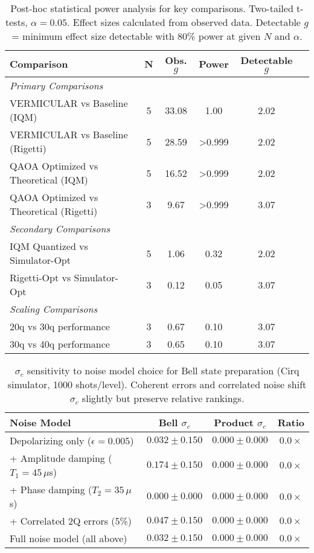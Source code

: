
\begin{table}[H]
\centering
\caption{Post-hoc statistical power analysis for key comparisons. Two-tailed t-tests, $\alpha = 0.05$. Effect sizes calculated from observed data. Detectable $g$ = minimum effect size detectable with 80\% power at given $N$ and $\alpha$.}
\label{tab:power_analysis}
\begin{tabular}{lccccc}
\toprule
\textbf{Comparison} & \textbf{N} & \textbf{Obs. $g$} & \textbf{Power} & \textbf{Detectable $g$} \\
\midrule
\multicolumn{5}{l}{\textit{Primary Comparisons}} \\
VERMICULAR vs Baseline (IQM) & 5 & 33.08 & 1.00 & 2.02 \\
VERMICULAR vs Baseline (Rigetti) & 5 & 28.59 & >0.999 & 2.02 \\
QAOA Optimized vs Theoretical (IQM) & 5 & 16.52 & >0.999 & 2.02 \\
QAOA Optimized vs Theoretical (Rigetti) & 3 & 9.67 & >0.999 & 3.07 \\
\midrule
\multicolumn{5}{l}{\textit{Secondary Comparisons}} \\
IQM Quantized vs Simulator-Opt & 5 & 1.06 & 0.32 & 2.02 \\
Rigetti-Opt vs Simulator-Opt & 3 & 0.12 & 0.05 & 3.07 \\
\midrule
\multicolumn{5}{l}{\textit{Scaling Comparisons}} \\
20q vs 30q performance & 3 & 0.67 & 0.10 & 3.07 \\
30q vs 40q performance & 3 & 0.65 & 0.10 & 3.07 \\
\midrule
\bottomrule
\end{tabular}
\end{table}


\begin{table}[H]
\centering
\caption{$\sigma_c$ sensitivity to noise model choice for Bell state preparation (Cirq simulator, 1000 shots/level). Coherent errors and correlated noise shift $\sigma_c$ slightly but preserve relative rankings.}
\label{tab:noise_model_comparison}
\begin{tabular}{lccc}  
\toprule
\textbf{Noise Model} & \textbf{Bell $\sigma_c$} & \textbf{Product $\sigma_c$} & \textbf{Ratio} \\
\midrule
Depolarizing only ($\epsilon=0.005$) & $0.032 \pm 0.150$ & $0.000 \pm 0.000$ & $0.0\times$ \\
+ Amplitude damping ($T_1=45\,\mu$s) & $0.174 \pm 0.150$ & $0.000 \pm 0.000$ & $0.0\times$ \\
+ Phase damping ($T_2=35\,\mu$s) & $0.000 \pm 0.000$ & $0.000 \pm 0.000$ & $0.0\times$ \\
+ Correlated 2Q errors (5\%) & $0.047 \pm 0.150$ & $0.000 \pm 0.000$ & $0.0\times$ \\
Full noise model (all above) & $0.032 \pm 0.150$ & $0.000 \pm 0.000$ & $0.0\times$ \\
\bottomrule
\end{tabular}
\end{table}

